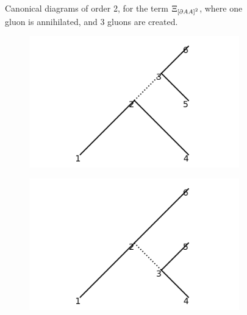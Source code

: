 \documentclass[11pt,a4paper,twoside,pdf]{article}
\numberwithin{equation}{section}
\begin{document}
\begin{figure}[h!]
\begin{subfigure}[t]{0.33\textwidth}
        \caption{ }
    \end{subfigure}
    \caption{Canonical diagrams of order 2, for the term $\Xi_{\left[ \partial AA \right]^2}$, 
    where one gluon is annihilated, and 3 gluons are created.}
    \label{fig:cannonical2_1to3}
\end{figure}

\begin{figure}[h!]
    \centering
    \begin{subfigure}[t]{0.33\textwidth}
        \centering
        \includegraphics[width=\textwidth]{plots/canonical/order2/9.png}
        \caption{ }
    \end{subfigure}%
    \begin{subfigure}[t]{0.33\textwidth}
        \centering
        \includegraphics[width=\textwidth]{plots/canonical/order2/10.png}
        \caption{ }
    \end{subfigure}
    \begin{subfigure}[t]{0.33\textwidth}

\end{subfigure}
\end{figure}
\end{document}

